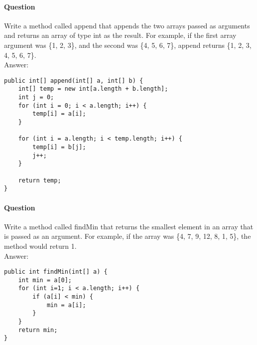 \documentclass{article}
\begin{document}
\addtocounter{question_num}{1}
\paragraph{Question }
Write a method called append that appends the two arrays passed as arguments and returns an array of type int as the result. For example, if the first array argument was \{1, 2, 3\}, and the second was \{4, 5, 6, 7\}, append returns \{1, 2, 3, 4, 5, 6, 7\}.
\\
{\color{red}Answer:}
\begin{lstlisting}
public int[] append(int[] a, int[] b) {
	int[] temp = new int[a.length + b.length];
	int j = 0;
	for (int i = 0; i < a.length; i++) {
		temp[i] = a[i];
	}

	for (int i = a.length; i < temp.length; i++) {
		temp[i] = b[j];
		j++;
	}

	return temp;
}
\end{lstlisting}

\addtocounter{question_num}{1}
\paragraph{Question }
Write a method called findMin that returns the smallest element in an array that is passed as an argument. For example, if the array was \{4, 7, 9, 12, 8, 1, 5\}, the method would return 1.
\\
{\color{red}Answer:}
\begin{lstlisting}
public int findMin(int[] a) {
	int min = a[0];
	for (int i=1; i < a.length; i++) {
		if (a[i] < min) {
			min = a[i];
		}
	}
	return min;
}
\end{lstlisting}
\end{document}
